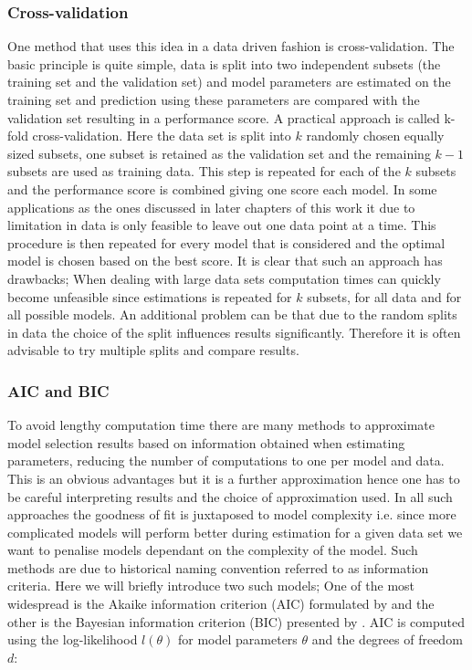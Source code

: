 \subsubsection{Cross-validation}
\label{sec:cross-validation}

One method that uses this idea in a data driven fashion is cross-validation. The basic principle is quite simple, data  is split into two independent subsets (the training set and the validation set) and model parameters are estimated on the training set and prediction using these parameters are compared with the validation set resulting in a performance score. A practical approach is called k-fold cross-validation. Here the data set is split into $k$ randomly chosen equally sized subsets, one subset is retained as the validation set and the remaining $k-1$ subsets are used as training data. This step is repeated for each of the $k$ subsets and the performance score is combined giving one score each model. In some applications as the ones discussed in later chapters of this work it due to limitation in data is only feasible to leave out one data point at a time. This procedure is then repeated for every model that is considered and the optimal model is chosen based on the best score. It is clear that such an approach has drawbacks; When dealing with large data sets computation times can quickly become unfeasible since estimations is repeated for $k$ subsets, for all data and for all possible models. An additional problem can be that due to the random splits in data the choice of the split influences results significantly. Therefore it is often advisable to try multiple splits and compare results.

\subsubsection{AIC and BIC}
\label{sec:aic}

To avoid lengthy computation time there are many methods to approximate model selection results based on information obtained when estimating parameters, reducing the number of computations to one per model and data. This is an obvious advantages but it is a further approximation hence one has to be careful interpreting results and the choice of approximation used. In all such approaches the goodness of fit is juxtaposed to model complexity i.e. since more complicated models will perform better during estimation for a given data set we want to penalise models dependant on the complexity of the model. Such methods are due to historical naming convention referred to as information criteria. Here we will briefly introduce two such models; One of the most widespread is the Akaike information criterion (AIC) formulated by \cite{Akaike:1974ih} and the other is the Bayesian information criterion (BIC) presented by \cite{Schwarz:1978uv}. AIC is computed using the log-likelihood $l(\theta)$ for model parameters $\theta$ and the degrees of freedom $d$:

